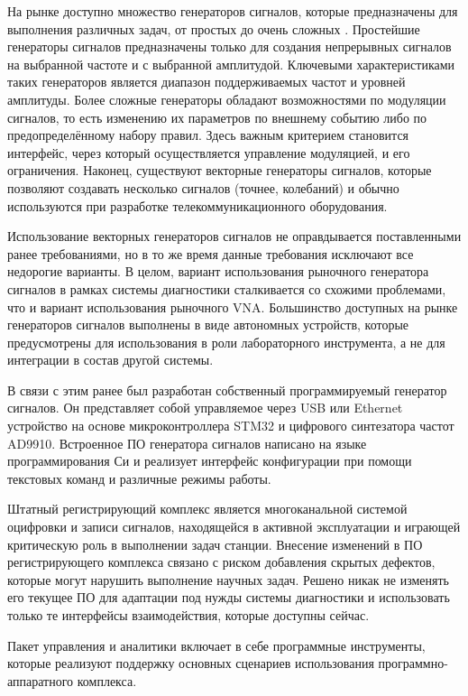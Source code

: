 \documentclass{report}
\begin{document}
На рынке доступно множество генераторов сигналов, которые предназначены для выполнения различных задач, от простых до очень сложных \cite{siggen1} \cite{siggen2}. Простейшие генераторы сигналов предназначены только для создания непрерывных сигналов на выбранной частоте и с выбранной амплитудой. Ключевыми характеристиками таких генераторов является диапазон поддерживаемых частот и уровней амплитуды. Более сложные генераторы обладают возможностями по модуляции сигналов, то есть изменению их параметров по внешнему событию либо по предопределённому набору правил. Здесь важным критерием становится интерфейс, через который осуществляется управление модуляцией, и его ограничения. Наконец, существуют векторные генераторы сигналов, которые позволяют создавать несколько сигналов (точнее, колебаний) и обычно используются при разработке телекоммуникационного оборудования.

Использование векторных генераторов сигналов не оправдывается поставленными ранее требованиями, но в то же время данные требования исключают все недорогие варианты. В целом, вариант использования рыночного генератора сигналов в рамках системы диагностики сталкивается со схожими проблемами, что и вариант использования рыночного VNA. Большинство доступных на рынке генераторов сигналов выполнены в виде автономных устройств, которые предусмотрены для использования в роли лабораторного инструмента, а не для интеграции в состав другой системы.

В связи с этим ранее был разработан собственный программируемый генератор сигналов. Он представляет собой управляемое через USB или Ethernet устройство на основе микроконтроллера STM32 и цифрового синтезатора частот AD9910. Встроенное ПО генератора сигналов написано на языке программирования Си и реализует интерфейс конфигурации при помощи текстовых команд и различные режимы работы.

Штатный регистрирующий комплекс является многоканальной системой оцифровки и записи сигналов, находящейся в активной эксплуатации и играющей критическую роль в выполнении  задач станции. Внесение изменений в ПО регистрирующего комплекса связано с риском добавления скрытых дефектов, которые могут нарушить выполнение научных задач. Решено никак не изменять его текущее ПО для адаптации под нужды системы диагностики и использовать только те интерфейсы взаимодействия, которые доступны сейчас.

Пакет управления и аналитики включает в себе программные инструменты, которые реализуют поддержку основных сценариев использования программно-аппаратного комплекса.
\end{document}
